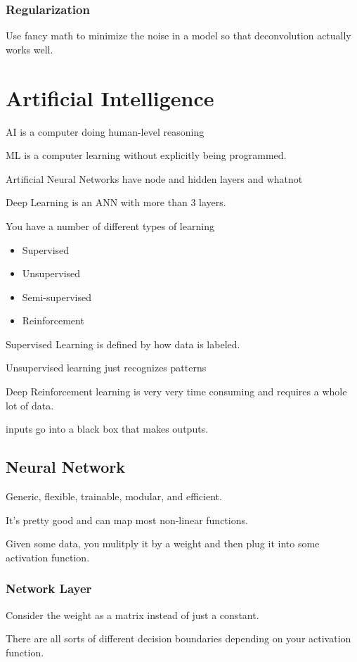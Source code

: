 \documentclass[fleqn]{report}
\begin{document}
\subsection{Regularization}
Use fancy math to minimize the noise in a model so that 
deconvolution actually works well. 

\chapter{Artificial Intelligence}
AI is a computer doing human-level reasoning 

ML is a computer learning without explicitly being programmed. 

Artificial Neural Networks have node and hidden layers and whatnot 

Deep Learning is an ANN with more than 3 layers. 

You have a number of different types of learning 
\begin{itemize}
    \item 
    Supervised 
    \item 
    Unsupervised 
    \item 
    Semi-supervised 
    \item 
    Reinforcement
\end{itemize}

Supervised Learning is defined by how data is labeled.

Unsupervised learning just recognizes patterns

Deep Reinforcement learning is very very time consuming and requires a 
whole lot of data. 

inputs go into a black box that makes outputs. 

\section{Neural Network}
Generic, flexible, trainable, modular, and efficient.

It's pretty good and can map most non-linear functions. 

Given some data, you mulitply it by a weight and then 
plug it into some activation function.

\subsection{Network Layer}
Consider the weight as a matrix instead of just a constant. 

There are all sorts of different decision boundaries depending on your 
activation function.
\end{document}
